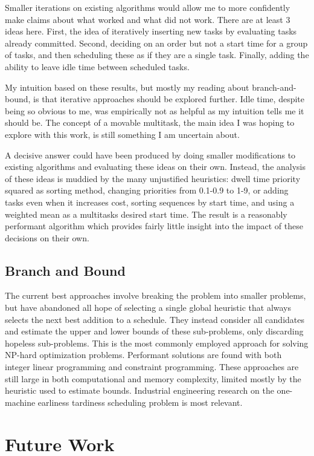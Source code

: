 \documentclass[conference]{IEEEtran}
\begin{document}
Smaller iterations on existing algorithms would allow me to more confidently make claims about what worked and what did not work.
There are at least 3 ideas here.
First, the idea of iteratively inserting new tasks by evaluating tasks already committed.
Second, deciding on an order but not a start time for a group of tasks, and then scheduling these as if they are a single task.
Finally, adding the ability to leave idle time between scheduled tasks.

My intuition based on these results, but mostly my reading about branch-and-bound, is that iterative approaches should be explored further.
Idle time, despite being so obvious to me, was empirically not as helpful as my intuition tells me it should be.
The concept of a movable multitask, the main idea I was hoping to explore with this work, is still something I am uncertain about.

A decisive answer could have been produced by doing smaller modifications to existing algorithms and evaluating these ideas on their own.
Instead, the analysis of these ideas is muddied by the many unjustified heuristics: dwell time priority squared as sorting method, changing priorities from 0.1-0.9 to 1-9, or adding tasks even when it increases cost, sorting sequences by start time, and using a weighted mean as a multitasks desired start time.
The result is a reasonably performant algorithm which provides fairly little insight into the impact of these decisions on their own.

\subsection{Branch and Bound}

The current best approaches involve breaking the problem into smaller problems, but have abandoned all hope of selecting a single global heuristic that always selects the next best addition to a schedule.
They instead consider all candidates and estimate the upper and lower bounds of these sub-problems, only discarding hopeless sub-problems.
This is the most commonly employed approach for solving NP-hard optimization problems.
Performant solutions are found with both integer linear programming and constraint programming.
These approaches are still large in both computational and memory complexity, limited mostly by the heuristic used to estimate bounds.
Industrial engineering research on the one-machine earliness tardiness scheduling problem is most relevant.

\section{Future Work}
\end{document}
